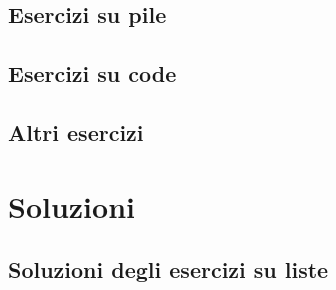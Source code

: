 \documentclass[a4paper,12pt,italian]{report}
\begin{document}
\renewcommand{\thechapter}{EP}
\chapter{Esercizi su pile}



\renewcommand{\thechapter}{EC}
\chapter{Esercizi su code}





\renewcommand{\thechapter}{EX}
\chapter{Altri esercizi}













\part{Soluzioni}

\renewcommand{\thechapter}{SL}
\chapter{Soluzioni degli esercizi su liste}













\end{document}
